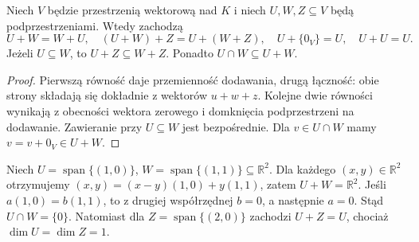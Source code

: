 \begin{stwierdzenie}
\label{prop:lin2-rachunek-sum}
Niech \(V\) będzie przestrzenią wektorową nad \(K\)
i niech \(U,W,Z\subseteq V\) będą podprzestrzeniami.
Wtedy zachodzą
\[
 U+W=W+U,\quad
 (U+W)+Z=U+(W+Z),\quad
 U+\{0_V\}=U,\quad U+U=U.
\]
Jeżeli \(U\subseteq W\), to \(U+Z\subseteq W+Z\).
Ponadto \(U\cap W\subseteq U+W\).
\end{stwierdzenie}
\begin{proof}
Pierwszą równość daje przemienność dodawania,
drugą łączność: obie strony składają się
dokładnie z wektorów \(u+w+z\).
Kolejne dwie równości wynikają
z obecności wektora zerowego i domknięcia
podprzestrzeni na dodawanie.
Zawieranie przy \(U\subseteq W\) jest bezpośrednie.
Dla \(v\in U\cap W\) mamy
\(v=v+0_V\in U+W\).
\end{proof}

\begin{przyklad}
\label{prz:lin2-suma-prostych}
Niech \(U=\operatorname{span}\{(1,0)\}\),
\(W=\operatorname{span}\{(1,1)\}\subseteq\mathbb R^2\).
Dla każdego \((x,y)\in\mathbb R^2\)
otrzymujemy
\((x,y)=(x-y)(1,0)+y(1,1)\),
zatem \(U+W=\mathbb R^2\).
Jeśli \(a(1,0)=b(1,1)\), to
z drugiej współrzędnej \(b=0\),
a następnie \(a=0\).
Stąd \(U\cap W=\{0\}\).
Natomiast dla
\(Z=\operatorname{span}\{(2,0)\}\)
zachodzi \(U+Z=U\), chociaż
\(\dim U=\dim Z=1\).
\end{przyklad}

